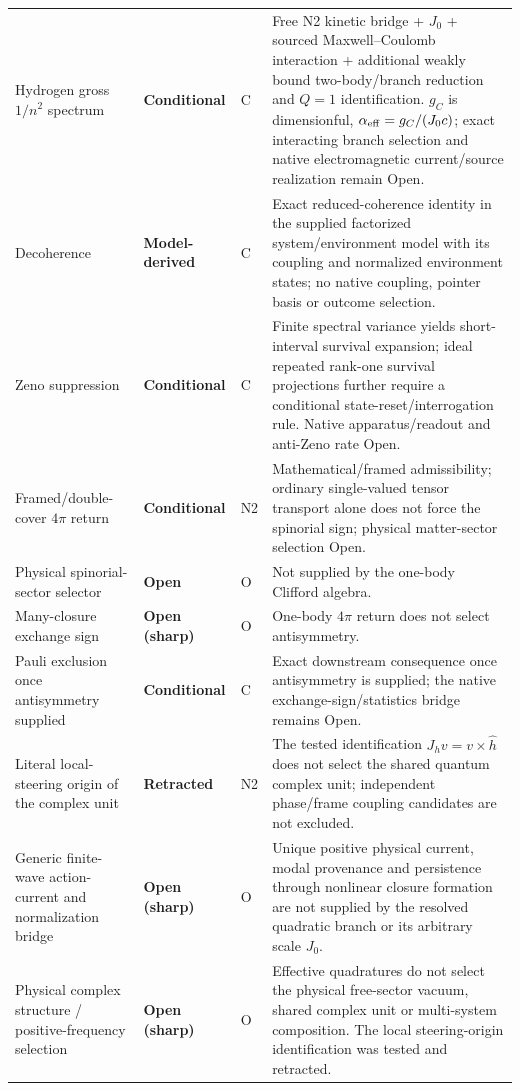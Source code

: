 \documentclass[11pt]{article}
\theoremstyle{definition}
\newcommand{\statusModelDerived}{\textcolor{cyan!55!black}{\textbf{Model-derived}}}
\newcommand{\statusConditional}{\textcolor{yellow!60!black}{\textbf{Conditional}}}
\newcommand{\statusOpen}{\textcolor{red!75!black}{\textbf{Open}}}
\newcommand{\statusSharpOpen}{\textcolor{red!35!black}{\textbf{Open (sharp)}}}
\newcommand{\statusRetracted}{\textcolor{red!80!black}{\textbf{Retracted}}}
\begin{document}
\begin{longtable}{P{3.7cm}P{2.7cm}P{1.45cm}P{6.6cm}}
Hydrogen gross $1/n^2$ spectrum & \statusConditional{} & C & Free N2 kinetic bridge + $J_0$ + sourced Maxwell--Coulomb interaction + additional weakly bound two-body/branch reduction and $Q=1$ identification. $g_C$ is dimensionful, $\alpha_{\rm eff}=g_C/(J_0c)$; exact interacting branch selection and native electromagnetic current/source realization remain Open.\\
Decoherence & \statusModelDerived{} & C & Exact reduced-coherence identity in the supplied factorized system/environment model with its coupling and normalized environment states; no native coupling, pointer basis or outcome selection.\\
Zeno suppression & \statusConditional{} & C & Finite spectral variance yields short-interval survival expansion; ideal repeated rank-one survival projections further require a conditional state-reset/interrogation rule. Native apparatus/readout and anti-Zeno rate Open.\\
Framed/double-cover $4\pi$ return & \statusConditional{} & N2 & Mathematical/framed admissibility; ordinary single-valued tensor transport alone does not force the spinorial sign; physical matter-sector selection Open.\\
Physical spinorial-sector selector & \statusOpen{} & O & Not supplied by the one-body Clifford algebra.\\
Many-closure exchange sign & \statusSharpOpen{} & O & One-body $4\pi$ return does not select antisymmetry.\\
Pauli exclusion once antisymmetry supplied & \statusConditional{} & C & Exact downstream consequence once antisymmetry is supplied; the native exchange-sign/statistics bridge remains Open.\\
Literal local-steering origin of the complex unit & \statusRetracted{} & N2 & The tested identification $J_hv=v\times\widehat h$ does not select the shared quantum complex unit; independent phase/frame coupling candidates are not excluded.\\
Generic finite-wave action-current and normalization bridge & \statusSharpOpen{} & O & Unique positive physical current, modal provenance and persistence through nonlinear closure formation are not supplied by the resolved quadratic branch or its arbitrary scale $J_0$.\\
Physical complex structure / positive-frequency selection & \statusSharpOpen{} & O & Effective quadratures do not select the physical free-sector vacuum, shared complex unit or multi-system composition. The local steering-origin identification was tested and retracted.\\

\end{longtable}
\end{document}
